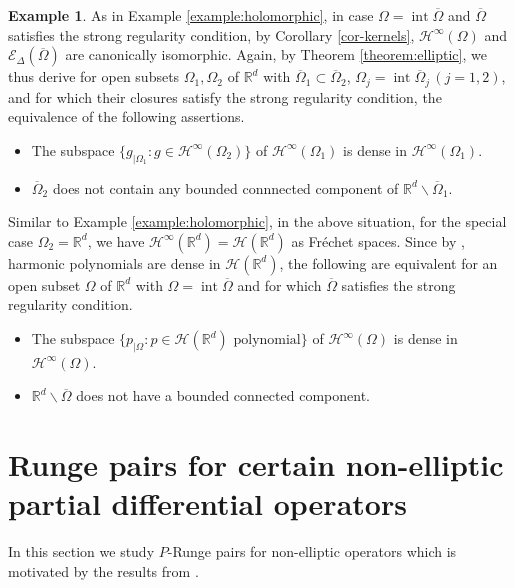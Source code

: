 \documentclass[10pt,leqno]{amsart}
\theoremstyle{definition}
\newtheorem{example}[prop]{Example}
\newcommand{\R}{\mathbb R}
\begin{document}
\begin{example}
	As in Example \ref{example:holomorphic}, in case $\Omega=\operatorname{int}\overline{\Omega}$ and $\overline{\Omega}$ satisfies the strong regularity condition, by Corollary \ref{cor-kernels}, $\mathcal{H}^\infty(\Omega)$ and $\mathscr{E}_\Delta(\overline{\Omega})$ are canonically isomorphic. Again, by Theorem \ref{theorem:elliptic}, we thus derive for open subsets $\Omega_1, \Omega_2$ of $\R^d$ with $\overline{\Omega}_1\subset\overline{\Omega}_2$, $\Omega_j=\operatorname{int}\overline{\Omega}_j\, (j=1,2)$, and for which their closures satisfy the strong regularity condition, the equivalence of the following assertions.
	\begin{itemize}
		\item[(i)] The subspace $\{g_{\mid\Omega_1}\colon g\in \mathcal{H}^\infty(\Omega_2)\}$ of $\mathcal{H}^\infty(\Omega_1)$ is dense in $\mathcal{H}^\infty(\Omega_1)$.
		\item[(ii)] $\overline{\Omega}_2$ does not contain any bounded connnected component of $\R^d\backslash\overline{\Omega}_1$.
	\end{itemize}
	Similar to Example \ref{example:holomorphic}, in the above situation, for the special case $\Omega_2=\R^d$, we have $\mathcal{H}^\infty(\R^d)=\mathcal{H}(\R^d)$ as Fr\'echet spaces. Since by \cite[Chapitre 1.2, Th\'eor\`eme 2']{Malgrange}, harmonic polynomials are dense in $\mathcal{H}(\R^d)$, the following are equivalent for an open subset $\Omega$ of $\R^d$ with $\Omega=\operatorname{int}\overline{\Omega}$ and for which $\overline{\Omega}$ satisfies the strong regularity condition.
	\begin{itemize}
		\item[(i')] The subspace $\{p_{\mid \Omega}\colon p\in\mathcal{H}(\R^d)\text{ polynomial}\}$ of $\mathcal{H}^\infty(\Omega)$ is dense in $\mathcal{H}^\infty(\Omega)$.
		\item[(ii')] $\R^d\backslash\overline{\Omega}$ does not have a bounded connected component.
	\end{itemize}
\end{example}

\section{Runge pairs for certain non-elliptic partial differential operators}\label{section:non-elliptic}

In this section we study $P$-Runge pairs for non-elliptic operators which is motivated by the results from \cite{DebKalmes2024,Kalmes2021}.
\end{document}
